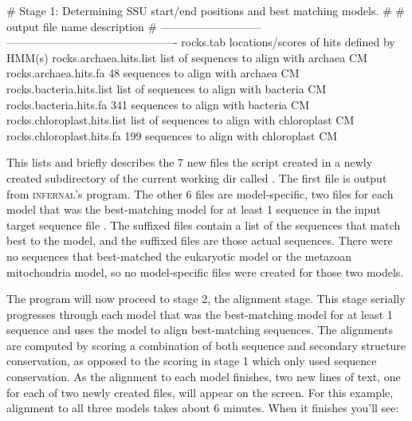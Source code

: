 \begin{sreoutput}
# Stage 1: Determining SSU start/end positions and best matching models.
#
# output file name             description                                   
# ---------------------------  ----------------------------------------------
  rocks.tab                    locations/scores of hits defined by HMM(s)
  rocks.archaea.hits.list      list of sequences to align with archaea CM
  rocks.archaea.hits.fa             48 sequences to align with archaea CM
  rocks.bacteria.hits.list     list of sequences to align with bacteria CM
  rocks.bacteria.hits.fa           341 sequences to align with bacteria CM
  rocks.chloroplast.hits.list  list of sequences to align with chloroplast CM
  rocks.chloroplast.hits.fa        199 sequences to align with chloroplast CM
\end{sreoutput}

This lists and briefly describes the 7 new files the script created in
a newly created subdirectory of the current working dir called
. The first file  is output from
\textsc{infernal}'s  program. The other 6 files are
model-specific, two files for each model that was the best-matching model for
at least 1 sequence in the input target sequence file
. The  suffixed files contain a list
of the sequences that match best to the model, and the 
suffixed files are those actual sequences. There were no sequences
that best-matched the eukaryotic model or the metazoan mitochondria
model, so no model-specific files were created for those two models.

\begin{comment}
Each of these file types is explained in more detail in the
``Description of output files'' section, but for now we'll continue
following the output of our example \prog{ssu-align} run.
\end{comment}

The program will now proceed to stage 2, the alignment stage. This
stage serially progresses through each model that was the
best-matching model for at least 1 sequence and uses the model to
align best-matching sequences. The alignments are computed by scoring
a combination of both sequence and secondary structure conservation,
as opposed to the scoring in stage 1 which only used sequence
conservation. As the alignment to each model finishes, two new lines
of text, one for each of two newly created files, will appear on the
screen. For this example, alignment to all three models takes about 6
minutes. When it finishes you'll see:

